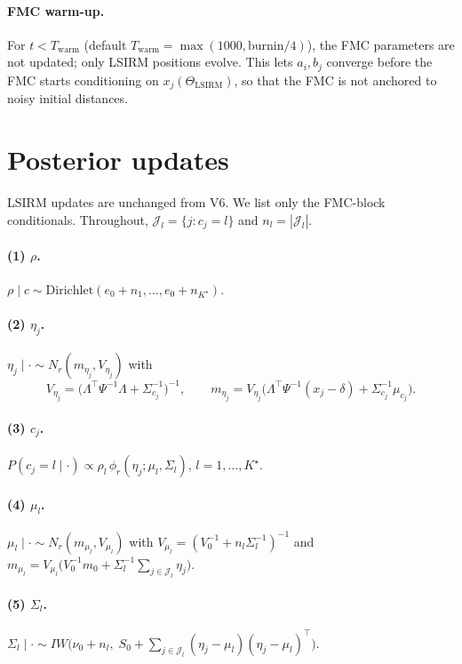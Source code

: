 \documentclass[11pt]{article}
\begin{document}
\paragraph{FMC warm-up.}
For $t<T_{\mathrm{warm}}$ (default $T_{\mathrm{warm}}=\max(1000,\mathrm{burnin}/4)$), the FMC parameters are not updated; only LSIRM positions evolve.
This lets $a_i,b_j$ converge before the FMC starts conditioning on $x_j(\Theta_{\mathrm{LSIRM}})$, so that the FMC is not anchored to noisy initial distances.

\section{Posterior updates}\label{sec:posterior-updates}

LSIRM updates are unchanged from V6.
We list only the FMC-block conditionals.
Throughout, $\mathcal{J}_l=\{j:c_j=l\}$ and $n_l=|\mathcal{J}_l|$.

\paragraph{(1) $\rho$.}
$\rho\mid c\sim\mathrm{Dirichlet}(e_0+n_1,\dots,e_0+n_{K^\star})$.

\paragraph{(2) $\eta_j$.}
$\eta_j\mid\cdot\sim N_r(m_{\eta_j},V_{\eta_j})$ with
\[
V_{\eta_j}=\bigl(\Lambda^\top\Psi^{-1}\Lambda+\Sigma_{c_j}^{-1}\bigr)^{-1},\qquad
m_{\eta_j}=V_{\eta_j}\bigl(\Lambda^\top\Psi^{-1}(x_j-\delta)+\Sigma_{c_j}^{-1}\mu_{c_j}\bigr).
\]

\paragraph{(3) $c_j$.}
$P(c_j=l\mid\cdot)\propto\rho_l\,\phi_r(\eta_j;\mu_l,\Sigma_l)$, $l=1,\dots,K^\star$.

\paragraph{(4) $\mu_l$.}
$\mu_l\mid\cdot\sim N_r(m_{\mu_l},V_{\mu_l})$ with
$V_{\mu_l}=(V_0^{-1}+n_l\Sigma_l^{-1})^{-1}$ and
$m_{\mu_l}=V_{\mu_l}\bigl(V_0^{-1}m_0+\Sigma_l^{-1}\sum_{j\in\mathcal{J}_l}\eta_j\bigr)$.

\paragraph{(5) $\Sigma_l$.}
$\Sigma_l\mid\cdot\sim IW\bigl(\nu_0+n_l,\;S_0+\sum_{j\in\mathcal{J}_l}(\eta_j-\mu_l)(\eta_j-\mu_l)^\top\bigr)$.
\end{document}
